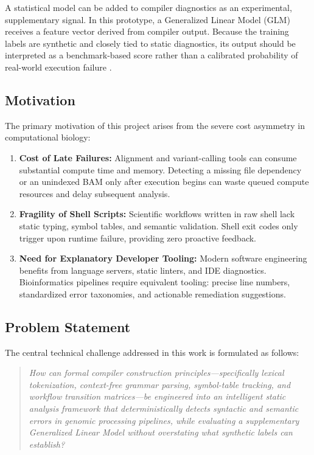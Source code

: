 \documentclass[12pt,a4paper]{article}
\begin{document}
A statistical model can be added to compiler diagnostics as an experimental, supplementary signal. In this prototype, a Generalized Linear Model (GLM) receives a feature vector derived from compiler output. Because the training labels are synthetic and closely tied to static diagnostics, its output should be interpreted as a benchmark-based score rather than a calibrated probability of real-world execution failure \cite{nelder1972,pedregosa2011}.

\subsection{Motivation}

The primary motivation of this project arises from the severe cost asymmetry in computational biology:
\begin{enumerate}[label=(\alph*)]
    \item \textbf{Cost of Late Failures:} Alignment and variant-calling tools can consume substantial compute time and memory. Detecting a missing file dependency or an unindexed BAM only after execution begins can waste queued compute resources and delay subsequent analysis.
    \item \textbf{Fragility of Shell Scripts:} Scientific workflows written in raw shell lack static typing, symbol tables, and semantic validation. Shell exit codes only trigger upon runtime failure, providing zero proactive feedback.
    \item \textbf{Need for Explanatory Developer Tooling:} Modern software engineering benefits from language servers, static linters, and IDE diagnostics. Bioinformatics pipelines require equivalent tooling: precise line numbers, standardized error taxonomies, and actionable remediation suggestions.
\end{enumerate}

\subsection{Problem Statement}

The central technical challenge addressed in this work is formulated as follows:

\begin{quote}
\textit{How can formal compiler construction principles---specifically lexical tokenization, context-free grammar parsing, symbol-table tracking, and workflow transition matrices---be engineered into an intelligent static analysis framework that deterministically detects syntactic and semantic errors in genomic processing pipelines, while evaluating a supplementary Generalized Linear Model without overstating what synthetic labels can establish?}
\end{quote}
\end{document}
